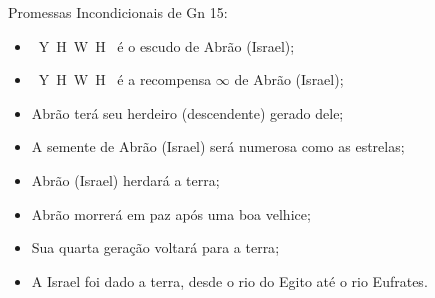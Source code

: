 \documentclass[12pt,aspectratio=169]{beamer}
\newcommand{\YA}{%
    \mbox{%
        Y\makebox[0pt][l]{\hspace{-0.178em}\raisebox{-0.00ex}{\scalebox{0.30}{E}}}%
        H\makebox[0pt][l]{\hspace{-0.010em}\raisebox{-0.00ex}{\scalebox{0.30}{O}}}%
        W\makebox[0pt][l]{\hspace{-0.245em}\raisebox{-0.00ex}{\scalebox{0.30}{A}}}%
        H%
    }%
}
\newcommand{\YEL}[1]{{\textcolor{TXyel}{#1}}}
\newcommand{\CYA}[1]{{\textcolor{TXcya}{#1}}}
\newcommand{\BRI}[1]{{\textcolor{BSpbg}{#1}}}   %
\begin{document}
    \begin{frame}{Promessas \YEL{Incondicionais} de \BRI{Gn 15}:}
        \begin{itemize}
            \item<1-> \BRI{\YA} é o \YEL{escudo} de Abrão (Israel);
            \item<2-> \BRI{\YA} é a \YEL{recompensa} $\infty$ de Abrão (Israel);
            \item<3-> Abrão terá seu herdeiro (descendente) \YEL{gerado dele};
            \item<4-> A semente de Abrão (Israel) será \YEL{numerosa} como as \CYA{estrelas};
            \item<5-> Abrão (Israel) \YEL{herdará} a \YEL{terra};
            \item<6-> Abrão morrerá em \YEL{paz} após uma \YEL{boa velhice};
            \item<7-> Sua quarta geração \YEL{voltará} para a \YEL{terra};
            \item<8-> \YEL{A Israel foi dado a terra, desde o rio do Egito até o rio Eufrates}.
        \end{itemize}
    \end{frame}

\end{document}
